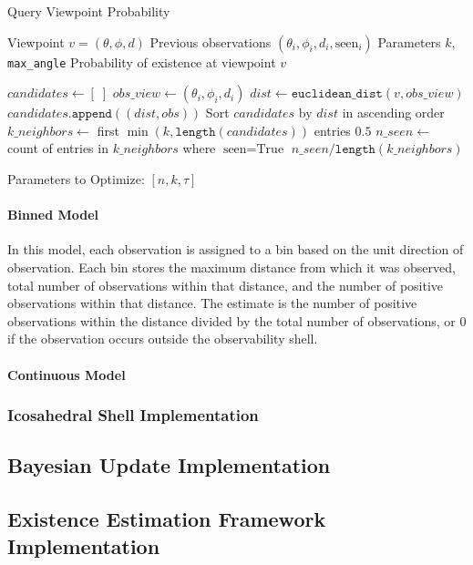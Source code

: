 \begin{minipage}{0.46\textwidth}
    \begin{algorithm}[H]
        \caption{Query Viewpoint Probability}
        \label{alg:query}
        \begin{small}
            \begin{algorithmic}
                \Require Viewpoint $v = (\theta, \phi, d)$
                \Require Previous observations $(\theta_i, \phi_i, d_i, \text{seen}_i)$
                \Require Parameters $k$, \texttt{max\_angle}
                \Ensure Probability of existence at viewpoint $v$

                \State $candidates \gets [\;]$
                \State $obs\_view \gets (\theta_i, \phi_i, d_i)$
                \State $dist \gets \texttt{euclidean\_dist}(v, obs\_view)$
                \State $candidates.\texttt{append}((dist, obs))$
                \EndIf
                \EndFor
                \State Sort $candidates$ by $dist$ in ascending order
                \State $k\_neighbors \gets$ first $\min(k, \texttt{length}(candidates))$ entries
                \State \Return $0.5$
                \EndIf
                \State $n\_seen \gets$ count of entries in $k\_neighbors$ where $\text{seen} = \text{True}$
                \State \Return $n\_seen / \texttt{length}(k\_neighbors)$
            \end{algorithmic}
        \end{small}
    \end{algorithm}
\end{minipage}

Parameters to Optimize: $[n, k, \tau]$

\paragraph{Binned Model}

In this model, each observation is assigned to a bin based on the unit direction of observation. Each bin stores the maximum distance from which it was observed, total number of observations within that distance, and the number of positive observations within that distance. The estimate is the number of positive observations within the distance divided by the total number of observations, or 0 if the observation occurs outside the observability shell.

\paragraph{Continuous Model}

\subsubsection{Icosahedral Shell Implementation}
\label{sec:icos_construction}

\subsection{Bayesian Update Implementation}

\subsection{Existence Estimation Framework Implementation}